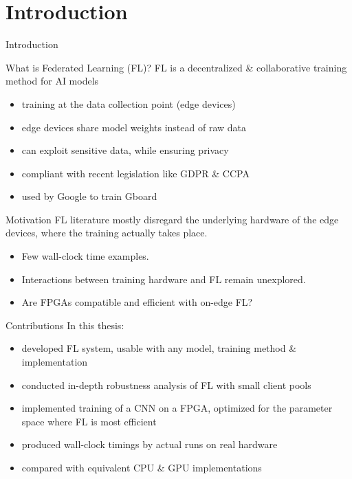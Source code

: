 \setlength{\parskip}{\baselineskip}
\section{Introduction}

\begin{frame}{Introduction}
    \begin{block}{What is Federated Learning (FL)?}
    	FL is a decentralized \& collaborative training method for AI models
    	\begin{itemize}
    		\item training at the data collection point (edge devices)
    	 	\item edge devices share model weights instead of raw data
    	 	\item can exploit sensitive data, while ensuring privacy
    	 	\item compliant with recent legislation like GDPR \& CCPA
    	 	\item used by Google to train Gboard
    	 \end{itemize}
    \end{block}
\end{frame}

\begin{frame}{Motivation}
    FL literature mostly disregard the underlying hardware of the edge devices, where the training actually takes place. %
    \begin{itemize}
        \item[\ding{228}] Few wall-clock time examples.
        \item[\ding{228}] Interactions between training hardware and FL remain unexplored.
        \item[\ding{228}] Are FPGAs compatible and efficient with on-edge FL?
    \end{itemize}
\end{frame}

\begin{frame}{Contributions}
    In this thesis:
	\begin{itemize}
		\item developed FL system, usable with any model, training method \& implementation
	 	\item conducted in-depth robustness analysis of FL with small client pools 
	 	\item implemented training of a CNN on a FPGA, optimized for the parameter space where FL is most efficient
	 	\item produced wall-clock timings by actual runs on real hardware
	 	\item compared with equivalent CPU \& GPU implementations
	 \end{itemize}
\end{frame}

